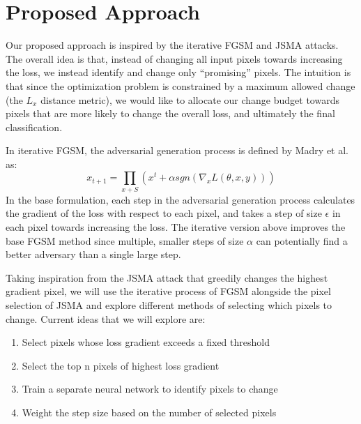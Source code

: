 \section{Proposed Approach}

Our proposed approach is inspired by the iterative FGSM and JSMA attacks. The overall idea is that, instead of changing all input pixels towards increasing the loss, we instead identify and change only ``promising'' pixels. The intuition is that since the optimization problem is constrained by a maximum allowed change (the $L_x$ distance metric), we would like to allocate our change budget towards pixels that are more likely to change the overall loss, and ultimately the final classification. 

In iterative FGSM, the adversarial generation process is defined by Madry et al. as:
$$x_{t+1} = \prod_{x+S}(x^t + \alpha sgn(\nabla_xL(\theta,x,y)))$$
In the base formulation, each step in the adversarial generation process calculates the gradient of the loss with respect to each pixel, and takes a step of size $\epsilon$ in each pixel towards increasing the loss. The iterative version above improves the base FGSM method since multiple, smaller steps of size $\alpha$ can potentially find a better adversary than a single large step. 

Taking inspiration from the JSMA attack that greedily changes the highest gradient pixel, we will use the iterative process of FGSM alongside the pixel selection of JSMA and explore different methods of selecting which pixels to change. Current ideas that we will explore are:
\begin{enumerate}
    \item Select pixels whose loss gradient exceeds a fixed threshold
    \item Select the top n pixels of highest loss gradient
    \item Train a separate neural network to identify pixels to change
    \item Weight the step size based on the number of selected pixels
\end{enumerate}
